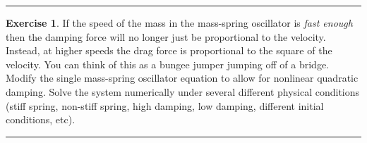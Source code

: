 \documentclass[
]{book}
\theoremstyle{definition}
\theoremstyle{definition}
\theoremstyle{definition}
\newtheorem{exercise}{Exercise}[chapter]
\theoremstyle{remark}
\begin{document}
\begin{center}\rule{0.5\linewidth}{0.5pt}\end{center}

\begin{exercise}
\protect\hypertarget{exr:unnamed-chunk-436}{}{\label{exr:unnamed-chunk-436} }If the speed of the mass in the mass-spring oscillator is \emph{fast enough} then the damping force will no longer just be proportional to the velocity. Instead, at higher speeds the drag force is proportional to the square of the velocity. You can think of this as a bungee jumper jumping off of a bridge. Modify the single mass-spring oscillator equation to allow for nonlinear quadratic damping. Solve the system numerically under several different physical conditions (stiff spring, non-stiff spring, high damping, low damping, different initial conditions, etc).
\end{exercise}

\begin{center}\rule{0.5\linewidth}{0.5pt}\end{center}
\end{document}

